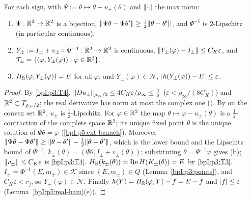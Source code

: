 \begin{lemma}\label{bpI:p5:graph}
For each sign, with $\Psi:=\theta\mapsto\theta+u_\pm(\theta)$ and $\lVert \cdot\rVert$ the max norm:
\begin{enumerate}[label=(\alph*)]
\item $\Psi:\mathbb{R}^2\to\mathbb{R}^2$ is a bijection, $\lVert \Psi\theta-\Psi\theta'\rVert\ge\tfrac12\lVert \theta-\theta'\rVert$, and $\Psi^{-1}$ is $2$-Lipschitz (in particular continuous).
\item $Y_\pm:=I_\pm+v_\pm\circ\Psi^{-1}:\mathbb{R}^2\to\mathbb{R}^2$ is continuous, $\lVert Y_\pm(\varphi)-I_\pm\rVert\le C_K\varepsilon$, and $\mathcal T_\pm=\{(\varphi,Y_\pm(\varphi)):\varphi\in\mathbb{R}^2\}$.
\item $H_{\mathbb{R}}(\varphi,Y_\pm(\varphi))=E$ for all $\varphi$, and $Y_\pm(\varphi)\in\mathcal N$, $\lvert h(Y_\pm(\varphi))-E\rvert\le\varepsilon$.
\end{enumerate}
\end{lemma}
\begin{proof}
\label{stepI:p5:gr-contr} By \ref{bpI:p3:T4}, $\lVert Du_\pm\rVert_{\rho_\infty/2}\le4C_K\varepsilon/\rho_\infty\le\tfrac12$ ($\varepsilon<\rho_\infty/(8C_K)$) and $\mathbb{R}^2\subset T_{\rho_\infty/2}$; the real derivative has norm at most the complex one (). By  on the convex set $\mathbb{R}^2$, $u_\pm$ is $\tfrac12$-Lipschitz.
\label{stepI:p5:gr-bij} For $\varphi\in\mathbb{R}^2$ the map $\theta\mapsto\varphi-u_\pm(\theta)$ is a $\tfrac12$-contraction of the complete space $\mathbb{R}^2$; its unique fixed point $\theta$ is the unique solution of $\Psi\theta=\varphi$ (\ref{bpI:p5:ext-banach}). Moreover $\lVert \Psi\theta-\Psi\theta'\rVert\ge\lVert \theta-\theta'\rVert-\tfrac12\lVert \theta-\theta'\rVert$, which is the lower bound and the Lipschitz bound of $\Psi^{-1}$.
\label{stepI:p5:gr-graph} $k_\pm(\theta)=(\Psi\theta,I_\pm+v_\pm(\theta))$; substituting $\theta=\Psi^{-1}\varphi$ gives (b); $\lVert v_\pm\rVert\le C_K\varepsilon$ is \ref{bpI:p3:T4}.
\label{stepI:p5:gr-energy} $H_{\mathbb{R}}(k_\pm(\theta))=\operatorname{Re}H(K_\pm(\theta))=E$ by \ref{bpI:p3:T3}. $I_\pm=\Phi^{-1}(E,m_\pm)\in\mathcal K$ since $(E,m_\pm)\in Q$ (Lemma~\ref{bpI:p3:points}), and $C_K\varepsilon<r_j$, so $Y_\pm(\varphi)\in\mathcal N$. Finally $h(Y)=H_{\mathbb{R}}(\varphi,Y)-f=E-f$ and $\lvert f\rvert\le\varepsilon$ (Lemma~\ref{bpI:p5:real-ham}(e)).
\end{proof}

